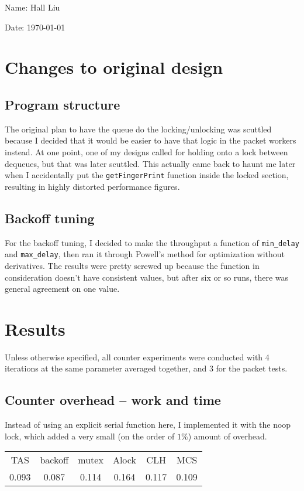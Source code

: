 \documentclass{article}
\begin{document}
Name: Hall Liu

Date: \today 
\vspace{20pt}

\section*{Changes to original design}
\subsection*{Program structure}
The original plan to have the queue do the locking/unlocking was scuttled because I decided that it would be easier to have that logic in the packet workers instead. At one point, one of my designs called for holding onto a lock between dequeues, but that was later scuttled. This actually came back to haunt me later when I accidentally put the \verb|getFingerPrint| function inside the locked section, resulting in highly distorted performance figures.
\subsection*{Backoff tuning}
For the backoff tuning, I decided to make the throughput a function of \verb|min_delay| and \verb|max_delay|, then ran it through Powell's method for optimization without derivatives. The results were pretty screwed up because the function in consideration doesn't have consistent values, but after six or so runs, there was general agreement on one value.
\section*{Results}
Unless otherwise specified, all counter experiments were conducted with 4 iterations at the same parameter averaged together, and 3 for the packet tests.
\subsection*{Counter overhead -- work and time}
Instead of using an explicit serial function here, I implemented it with the noop lock, which added a very small (on the order of $1\%$) amount of overhead.

\begin{tabular}{c|c|c|c|c|c}
    TAS&backoff&mutex&Alock&CLH&MCS\\
    0.093& 0.087& 0.114& 0.164& 0.117& 0.109\\
\end{tabular}
\end{document}
